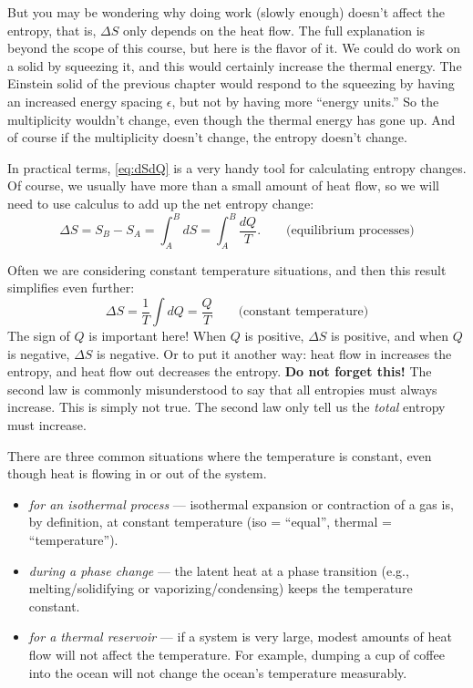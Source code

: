 But you may be wondering why doing work (slowly enough) doesn't affect
the entropy, that is, $\Delta S$ only depends on the heat flow.  The
full explanation is beyond the scope of this course, but here is the
flavor of it.  We could do work on a solid by squeezing it, and this
would certainly increase the thermal energy.  The Einstein solid of
the previous chapter would respond to the squeezing by having an
increased energy spacing $\epsilon$, but not by having more ``energy
units.''  So the multiplicity wouldn't change, even though the thermal
energy has gone up.  And of course if the multiplicity doesn't change,
the entropy doesn't change.

In practical terms, \eqref{eq:dSdQ} is a very handy tool for
calculating entropy changes.  Of course, we usually have more than a
small amount of heat flow, so we will need to use calculus to add up
the net entropy change:
\begin{equation}
\Delta S = S_B - S_A = \int_A^B dS = \int_A^B \frac{dQ}{T}.
\qquad\text{(equilibrium processes)}
\label{eq:DeltaSgeneral}
\end{equation}

Often we are considering constant temperature situations, and then
this result simplifies even further:
\begin{equation}
\Delta S= \frac{1}{T}\int dQ = \frac{Q}{T} \qquad\text{(constant temperature)}
\label{eq:deltaS_isothermal}
\end{equation}
The sign of $Q$ is important here!  When $Q$ is positive, $\Delta S$
is positive, and when $Q$ is negative, $\Delta S$ is negative.  Or to
put it another way: heat flow in increases the entropy, and heat flow
out decreases the entropy.  \textbf{Do not forget this!}  The second law
is commonly misunderstood to say that all entropies must always
increase.  This is simply not true.  The second law only tell us the
\textit{total} entropy must increase.

There are three common situations where the temperature is constant,
even though heat is flowing in or out of the system.
\begin{itemize}
\item \textit{for an isothermal process} --- isothermal expansion or
  contraction of a gas is, by definition, at constant temperature (iso
  = ``equal'', thermal = ``temperature'').
\item \textit{during a phase change} --- the latent heat at a phase
  transition (e.g., melting/solidifying or vaporizing/condensing)
  keeps the temperature constant.
\item \textit{for a thermal reservoir} --- if a system is very large,
  modest amounts of heat flow will not affect the temperature.  For
  example, dumping a cup of coffee into the ocean will not change the
  ocean's temperature measurably.
\end{itemize}

